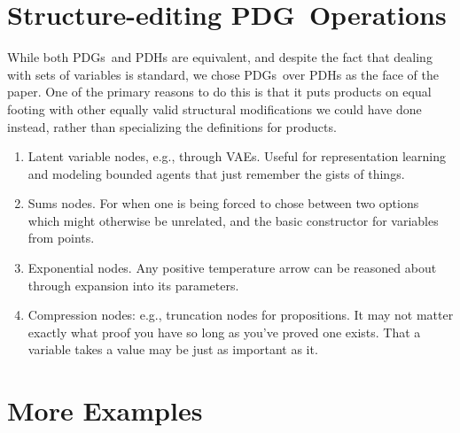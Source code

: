 \documentclass{article}
\newcommand{\MN}{PDG}
\newcommand{\MNH}{PDH}
\newcommand{\MNs}{\MN s}
\numberwithin{equation}{section}
\begin{document}
	
	
	\section{Structure-editing \MN\ Operations}
	
	While both \MNs\ and \MNH s are equivalent, and despite the fact that dealing with sets of variables is standard, we chose \MNs\ over \MNH s as the face of the paper. One of the primary reasons to do this is that it puts products on equal footing with other equally valid structural modifications we could have done instead, rather than specializing the definitions for products.
	
	\begin{enumerate}
		\item Latent variable nodes, e.g., through VAEs. Useful for representation learning and modeling bounded agents that just remember the gists of things.
		
		\item Sums nodes. For when one is being forced to chose between two options which might otherwise be unrelated, and the basic constructor for variables from points.
		
		\item Exponential nodes. Any positive temperature arrow can be reasoned about through expansion into its parameters.
		
		\item Compression nodes: e.g., truncation nodes for propositions. It may not matter exactly what proof you have so long as you've proved one exists. That a variable takes a value may be just as important as it.
	\end{enumerate}
	
	
	\section{More Examples}\label{sec:more-examples}
	
	\begin{example}
		\label{ex:corrob}
	\end{example}
\end{document}
